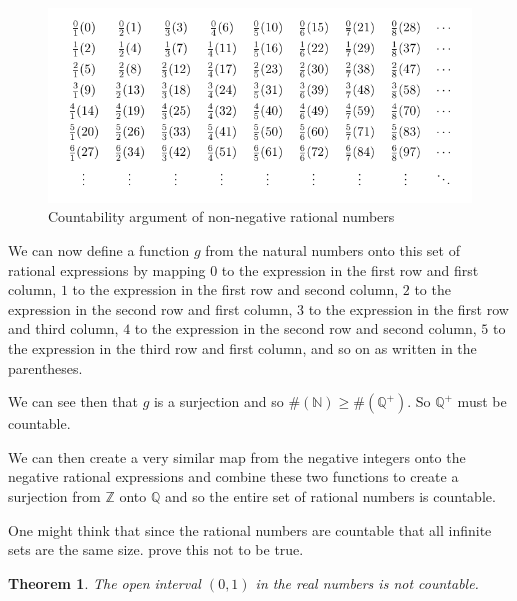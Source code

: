 \documentclass[
]{book}
\newtheorem{theorem}{Theorem}[chapter]
\theoremstyle{definition}
\theoremstyle{definition}
\theoremstyle{definition}
\theoremstyle{definition}
\theoremstyle{remark}
\begin{document}
\begin{figure}

{\centering \includegraphics[width=1\linewidth]{tikz/table-natural-integers3} 

}

\caption{Countability argument of non-negative rational numbers}\label{fig:rational-countable}
\end{figure}

We can now define a function \(g\) from the natural numbers onto this set of rational expressions by mapping \(0\) to the expression in the first row and first column, \(1\) to the expression in the first row and second column, \(2\) to the expression in the second row and first column, \(3\) to the expression in the first row and third column, \(4\) to the expression in the second row and second column, \(5\) to the expression in the third row and first column, and so on as written in the parentheses.

We can see then that \(g\) is a surjection and so \(\#(\mathbb{N}) \geq \#(\mathbb{Q}^+)\). So \(\mathbb{Q}^+\) must be countable.

We can then create a very similar map from the negative integers onto the negative rational expressions and combine these two functions to create a surjection from \(\mathbb{Z}\) onto \(\mathbb{Q}\) and so the entire set of rational numbers is countable.

One might think that since the rational numbers are countable that all infinite sets are the same size. \cite{Cantor} prove this not to be true.

\begin{theorem}
The open interval \((0,1)\) in the real numbers is not countable.
\end{theorem}
\end{document}
